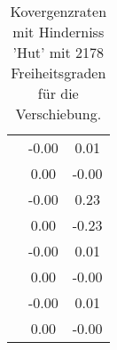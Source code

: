 \begin{table}
\begin{tabular}{c|cc|}
\multicolumn{1}{|c|}{} & \multicolumn{1}{|c|}{     -0.00} & \multicolumn{1}{|c|}{      0.01} \\ 
\multicolumn{1}{|c|}{} & \multicolumn{1}{|c|}{      0.00} & \multicolumn{1}{|c|}{     -0.00} \\ 
\multicolumn{1}{|c|}{} & \multicolumn{1}{|c|}{     -0.00} & \multicolumn{1}{|c|}{      0.23} \\ 
\multicolumn{1}{|c|}{} & \multicolumn{1}{|c|}{      0.00} & \multicolumn{1}{|c|}{     -0.23} \\ 
\multicolumn{1}{|c|}{} & \multicolumn{1}{|c|}{     -0.00} & \multicolumn{1}{|c|}{      0.01} \\ 
\multicolumn{1}{|c|}{} & \multicolumn{1}{|c|}{      0.00} & \multicolumn{1}{|c|}{     -0.00} \\ 
\multicolumn{1}{|c|}{} & \multicolumn{1}{|c|}{     -0.00} & \multicolumn{1}{|c|}{      0.01} \\ 
\multicolumn{1}{|c|}{} & \multicolumn{1}{|c|}{      0.00} & \multicolumn{1}{|c|}{     -0.00} \\ 
\hline 
\end{tabular}\caption{Kovergenzraten mit Hinderniss 'Hut' mit 2178 Freiheitsgraden für die Verschiebung.}\label{tab:Rate_Hut_level4}
\end{table} 

